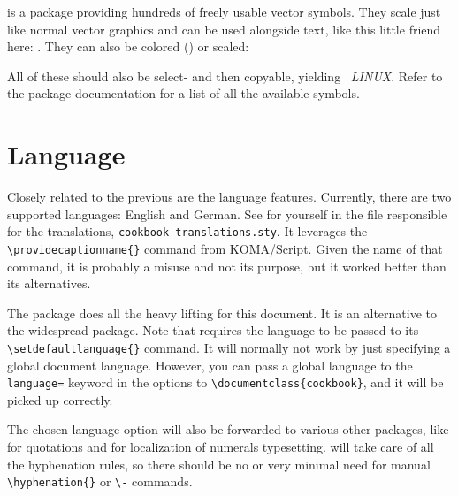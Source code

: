  is a package providing hundreds of freely usable vector
symbols.
They scale just like normal vector graphics and can be used alongside text, like
this little friend here: .
They can also be colored (\textcolor{mRed}{}) or scaled:
\begin{center}
\end{center}
All of these should also be select- and then copyable, yielding \
\emph{LINUX}.
Refer to the package documentation for a list of all the available symbols.

\section{Language}

Closely related to the previous  are the language features.
Currently, there are two supported languages: English and German.
See for yourself in the file responsible for the translations,
\verb|cookbook-translations.sty|.
It leverages the \verb|\providecaptionname{}| command from KOMA\-/Script.
Given the name of that command, it is probably a misuse and not its purpose, but
it worked better than its alternatives.

The  package does all the heavy lifting for this document.
It is an alternative to the widespread \ctanpackage{babel} package.
Note that \ctanpackage{polyglossia} requires the language to be passed to its
\verb|\setdefaultlanguage{}| command.
It will normally not work by just specifying a global document language.
However, you can pass a global language to the \verb|language=| keyword in the
options to \verb|\documentclass{cookbook}|, and it will be picked up correctly.

The chosen language option will also be forwarded to various other packages, like
\ctanpackage{enquote} for quotations and \ctanpackage{siunitx} for localization of
numerals typesetting.
 will take care of all the hyphenation rules, so there
should be no or very minimal need for manual \verb|\hyphenation{}| or \verb|\-|
commands.

